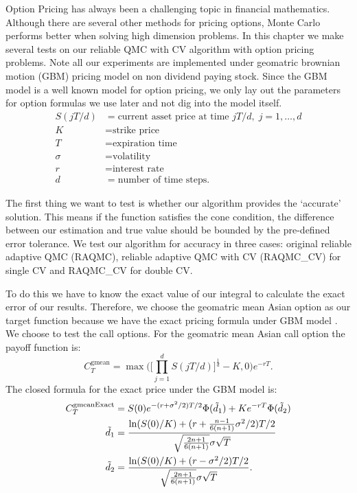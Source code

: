 

Option Pricing has always been a challenging topic in financial mathematics. 
Although there are several other methods for pricing options, Monte Carlo performs better when solving high dimension problems.
In this chapter we make several tests on our reliable QMC with CV algorithm with option pricing problems. 
Note all our experiments are implemented under geomatric brownian motion (GBM) pricing model on non dividend paying stock.  
Since the GBM model is a well known model for option pricing, we only lay out the parameters for option formulas we use later and not dig into the model itself. 
\begin{align*}
    S(jT/d)&=\text{current asset price at time $jT/d,\; j=1,\dots,d$}\\
    K&=\text{strike price}\\
    T&=\text{expiration time}\\
    \sigma&=\text{volatility}\\
    r&=\text{interest rate}\\
    d&=\text{number of time steps}.
\end{align*}

The first thing we want to test is whether our algorithm provides the `accurate' solution. 
This means if the function satisfies the cone condition, the difference between our estimation and true value should be bounded by the pre-defined error tolerance. 
We test our algorithm for accuracy in three cases: original reliable adaptive QMC (RAQMC), reliable adaptive QMC with CV (RAQMC\_CV) for single CV and RAQMC\_CV for double CV. 

To do this we have to know the exact value of our integral to calculate the exact error of our results. 
Therefore, we choose the geomatric mean Asian option as our target function because we have the exact pricing formula under GBM model \cite{kemna1990pricing}. 
We choose to test the call options. For the geomatric mean Asian call option the payoff function is:   
\[ C_{T}^{\mathrm{gmean}} = \max\Big(\Big[\prod_{j=1}^{d}S(jT/d) \Big]^\frac{1}{d}-K, 0\Big)e^{-rT}.\]
The closed formula for the exact price under the GBM model is: 
\begin{align}
    C_{T}^{\mathrm{gmeanExact}} 
    &= S(0)e^{-(r+\sigma^2/2)T/2}\Phi(\tilde{d}_1)+Ke^{-rT}\Phi(\tilde{d}_2)    \label{eq:exactgmean}\\
    \tilde{d}_1 &=\frac{\ln(S(0)/K)+(r+\frac{n-1}{6(n+1)}\sigma^2/2)T/2}
    {\sqrt{\frac{2n+1}{6(n+1)}}\sigma\sqrt{T}}\notag\\
    \tilde{d}_2 &=\frac{\ln(S(0)/K)+(r-\sigma^2/2)T/2}
            {\sqrt{\frac{2n+1}{6(n+1)}}\sigma\sqrt{T}}\notag.
\end{align}

